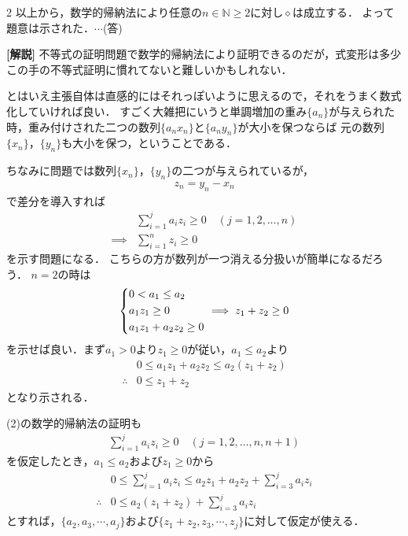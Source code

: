 \documentclass[../../main.tex]{subfiles}
\begin{document}
\begin{multicols}{2}
  以上から，数学的帰納法により任意の$n \in \mathbb{N} \ge 2$に対し$\diamond$は成立する．
  よって題意は示された．$\cdots$(答)

  {\bf [解説]}
  不等式の証明問題で数学的帰納法により証明できるのだが，式変形は多少この手の不等式証明に慣れてないと難しいかもしれない．

  とはいえ主張自体は直感的にはそれっぽいように思えるので，それをうまく数式化していければ良い．
  すごく大雑把にいうと単調増加の重み$\{a_n\}$が与えられた時，重み付けされた二つの数列$\{a_nx_n\}$と$\{a_ny_n\}$が大小を保つならば
  元の数列$\{x_n\}$，$\{y_n\}$も大小を保つ，ということである．

  ちなみに問題では数列$\{x_n\}$，$\{y_n\}$の二つが与えられているが，
  \begin{align}
    z_n = y_n - x_n
  \end{align}
  で差分を導入すれば
  \begin{align}
    & \sum_{i=1}^j a_i z_i \ge 0 \quad (j=1, 2, \dots, n) \\
    \implies
    & \sum_{i=1}^n z_i \ge 0
  \end{align}
  を示す問題になる．
  こちらの方が数列が一つ消える分扱いが簡単になるだろう．
  $n=2$の時は
  \begin{align}
    \begin{dcases}
      0 < a_1 \le a_2 \\
      a_1 z_1 \ge 0   \\
      a_1 z_1 + a_2z_2 \ge 0
    \end{dcases}
    \implies
    z_1 + z_2 \ge 0
  \end{align}
  を示せば良い．まず$a_1 >0$より$z_1 \ge 0$が従い，$a_1 \le a_2$より
  \begin{align}
    & 0 \le a_1 z_1 + a_2z_2 \le a_2(z_1 + z_2) \\
    \therefore
    & 0 \le z_1+z_2
  \end{align}
  となり示される．

  (2)の数学的帰納法の証明も
  \begin{align}
    \sum_{i=1}^j a_i z_i \ge 0 \quad (j=1, 2, \dots, n,n+1)
  \end{align}
  を仮定したとき，$a_1 \le a_2$および$z_1 \ge 0$から
  \begin{align}
    & 0 \le \sum_{i=1}^j a_i z_i \le a_2z_1 + a_2z_2 + \sum_{i=3}^{j} a_iz_i \\
    \therefore
    & 0 \le a_2(z_1+z_2) + \sum_{i=3}^{j} a_iz_i
  \end{align}
  とすれば，$\{a_2,a_3,\cdots,a_j\}$および$\{z_1+z_2,z_3,\cdots,z_j\}$に対して仮定が使える．


\end{multicols}
\end{document}
